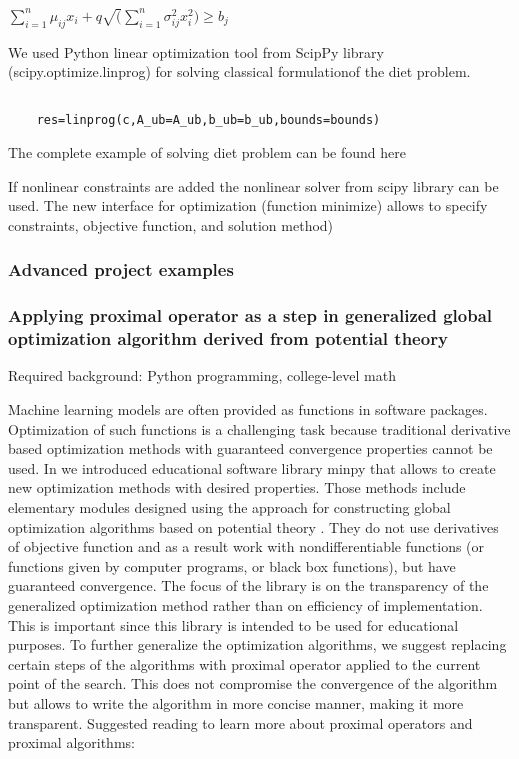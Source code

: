 \documentclass{article} %
\begin{document}
$\sum_{i=1}^{n}{\mu_{ij}x_i}+q \sqrt (\sum_{i=1}^{n}{\sigma_{ij}^2x_i^2}) \ge b_j$ 


We used Python linear optimization tool  from ScipPy library (scipy.optimize.linprog) for solving classical formulationof the diet problem.


\begin{verbatim}

    res=linprog(c,A_ub=A_ub,b_ub=b_ub,bounds=bounds)

\end{verbatim}

The complete example of solving diet problem can be found here \cite{diet}

 If nonlinear constraints are added the nonlinear solver from scipy library can be used. The new interface for optimization (function minimize) allows to specify constraints, objective function, and solution method)

 \subsubsection{Advanced project examples}

  \subsubsection{Applying proximal operator as a step in generalized global optimization algorithm derived from potential theory}


Required background: Python programming, college-level math

Machine learning models are often provided as functions in software packages. Optimization of such functions is a challenging task because traditional derivative based optimization methods with guaranteed convergence properties cannot be used. In \cite{MP} we introduced educational software library minpy that allows to create new optimization methods with desired properties. Those methods include elementary modules designed using the approach for constructing global optimization algorithms based on potential theory \cite{KAP1,KAP2}. They do not use derivatives of objective function and as a result work with nondifferentiable functions (or functions given by computer programs, or black box functions), but have guaranteed convergence. The focus of the library is on the transparency of the generalized optimization method rather than on efficiency of implementation. This is important since this library is intended to be used for educational purposes. To further generalize the optimization algorithms, we suggest replacing certain steps of the algorithms with proximal operator applied to the current point of the search. This does not compromise the convergence of the algorithm  \cite{KAP3}  but allows to write the algorithm in more concise manner, making it more transparent. Suggested reading to learn more about proximal operators and proximal algorithms: \cite{LAKLG,RGMN,SGFLZ}
\end{document}
